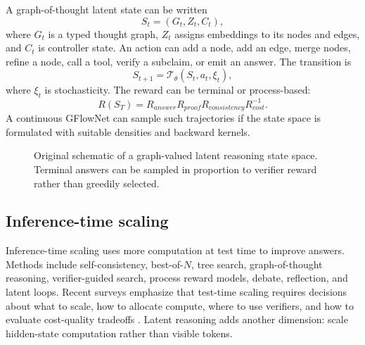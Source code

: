 \documentclass[11pt]{article}
\newcommand{\1}{\mathbf{1}}
\begin{document}
A graph-of-thought latent state can be written
\[
S_t=(G_t,Z_t,C_t),
\]
where $G_t$ is a typed thought graph, $Z_t$ assigns embeddings to its nodes and edges, and $C_t$ is controller state. An action can add a node, add an edge, merge nodes, refine a node, call a tool, verify a subclaim, or emit an answer. The transition is
\[
S_{t+1}=\mathcal{T}_\theta(S_t,a_t,\xi_t),
\]
where $\xi_t$ is stochasticity. The reward can be terminal or process-based:
\[
R(S_T)=R_{answer}R_{proof}R_{consistency}R_{cost}^{-1}.
\]
A continuous GFlowNet can sample such trajectories if the state space is formulated with suitable densities and backward kernels.

\begin{figure}[H]
\centering
{}
\caption{Original schematic of a graph-valued latent reasoning state space. Terminal answers can be sampled in proportion to verifier reward rather than greedily selected.}
\label{fig:gflownet_got}
\end{figure}

\subsection{Inference-time scaling}

Inference-time scaling uses more computation at test time to improve answers. Methods include self-consistency, best-of-$N$, tree search, graph-of-thought reasoning, verifier-guided search, process reward models, debate, reflection, and latent loops. Recent surveys emphasize that test-time scaling requires decisions about what to scale, how to allocate compute, where to use verifiers, and how to evaluate cost-quality tradeoffs \cite{ZhangTTSSurvey2025,Balachandran2025,LiSearch2025}. Latent reasoning adds another dimension: scale hidden-state computation rather than visible tokens.
\end{document}

